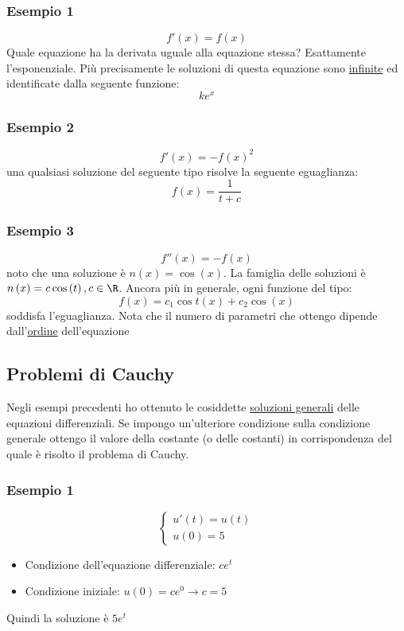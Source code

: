 \subsubsection*{Esempio 1}
\[
	f'\left( x \right) = f\left( x \right)
\]
Quale equazione ha la derivata uguale alla equazione stessa? Esattamente l'esponenziale. Più precisamente le soluzioni di questa equazione sono \underline{infinite} ed identificate dalla seguente funzione:
\[
	k e^{x}
\]
\subsubsection*{Esempio 2}
\[
	f'\left( x \right) = - f\left( x \right) ^2
\]
una qualsiasi soluzione del seguente tipo risolve la seguente eguaglianza:
\[
	f\left( x \right) = \frac{1}{t + c}
\]
\subsubsection*{Esempio 3}
\[
	f''\left( x \right) = - f\left( x \right)
\]
noto che una soluzione è $ n\left( x \right) = \cos \left( x \right)  $. La famiglia delle soluzioni è $ n\left( x \right) = c \cos \left( t \right)  , c \in  \R$. Ancora più in generale, ogni funzione del tipo:
\[
	f\left( x \right) = c_1 \cos t\left( x \right)  + c_2 \cos \left( x \right)
\]
soddisfa l'eguaglianza. Nota che il numero di parametri che ottengo dipende dall'\underline{ordine} dell'equazione
\subsection{Problemi di Cauchy}
Negli esempi precedenti ho ottenuto le cosiddette \underline{soluzioni generali} delle equazioni differenziali. Se impongo un'ulteriore condizione sulla condizione generale ottengo il valore della costante (o delle costanti) in corrispondenza del quale è risolto il problema di Cauchy.
\subsubsection*{Esempio 1}
\[
	\begin{cases}
		u'\left( t \right) = u\left( t \right) \\
		u\left( 0 \right) = 5
	\end{cases}
\]
\begin{itemize}
	\item Condizione dell'equazione differenziale: $ ce^{t} $
	\item Condizione iniziale: $ u\left( 0 \right) = ce^{0} \rightarrow c = 5 $
\end{itemize}
Quindi la soluzione è $ 5 e ^{t} $
